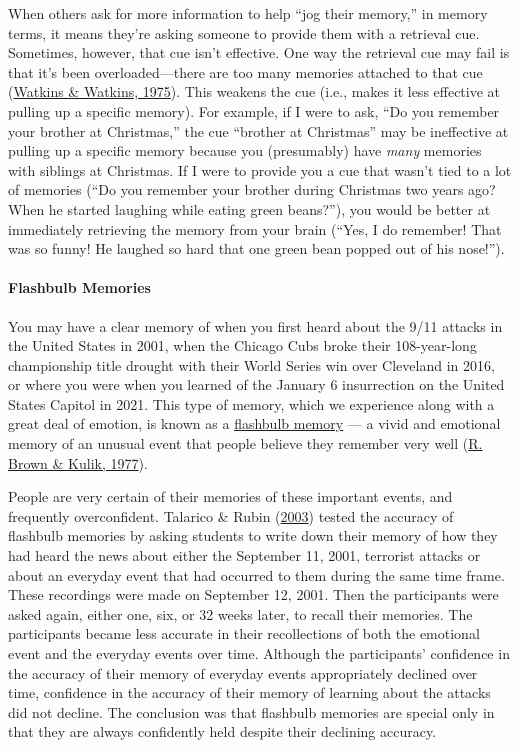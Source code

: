 \documentclass[
]{krantz}
\begin{document}
When others ask for more information to help ``jog their memory,'' in memory terms, it means they're asking someone to provide them with a retrieval cue. Sometimes, however, that cue isn't effective. One way the retrieval cue may fail is that it's been overloaded---there are too many memories attached to that cue (\protect\hyperlink{ref-watkins1975buildup}{Watkins \& Watkins, 1975}). This weakens the cue (i.e., makes it less effective at pulling up a specific memory). For example, if I were to ask, ``Do you remember your brother at Christmas,'' the cue ``brother at Christmas'' may be ineffective at pulling up a specific memory because you (presumably) have \emph{many} memories with siblings at Christmas. If I were to provide you a cue that wasn't tied to a lot of memories (``Do you remember your brother during Christmas two years ago? When he started laughing while eating green beans?''), you would be better at immediately retrieving the memory from your brain (``Yes, I do remember! That was so funny! He laughed so hard that one green bean popped out of his nose!'').

\hypertarget{flashbulb-memories}{%
\paragraph*{Flashbulb Memories}\label{flashbulb-memories}}

You may have a clear memory of when you first heard about the 9/11 attacks in the United States in 2001, when the Chicago Cubs broke their 108-year-long championship title drought with their World Series win over Cleveland in 2016, or where you were when you learned of the January 6 insurrection on the United States Capitol in 2021. This type of memory, which we experience along with a great deal of emotion, is known as a \protect\hyperlink{flashbulb-memory}{flashbulb memory} --- a vivid and emotional memory of an unusual event that people believe they remember very well (\protect\hyperlink{ref-brown1977flashbulb}{R. Brown \& Kulik, 1977}).

People are very certain of their memories of these important events, and frequently overconfident. Talarico \& Rubin (\protect\hyperlink{ref-talarico2003confidence}{2003}) tested the accuracy of flashbulb memories by asking students to write down their memory of how they had heard the news about either the September 11, 2001, terrorist attacks or about an everyday event that had occurred to them during the same time frame. These recordings were made on September 12, 2001. Then the participants were asked again, either one, six, or 32 weeks later, to recall their memories. The participants became less accurate in their recollections of both the emotional event and the everyday events over time. Although the participants' confidence in the accuracy of their memory of everyday events appropriately declined over time, confidence in the accuracy of their memory of learning about the attacks did not decline. The conclusion was that flashbulb memories are special only in that they are always confidently held despite their declining accuracy.
\end{document}
